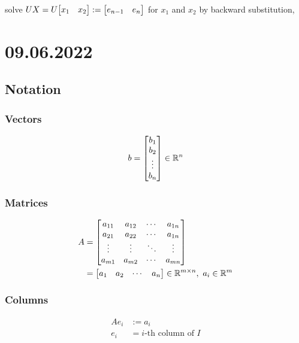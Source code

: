 \documentclass[11pt]{article}
\newcommand{\triu}{\mathop{\mathrm{triu}}}
\newcommand{\T}{\mathrm{T}}
\begin{document}
\noindent solve $UX = U\mqty[x_{1} & x_{2}] := \mqty[e_{n-1} & e_{n}]$ for $x_{1}$ and $x_{2}$ by backward substitution,

\newpage
\section{09.06.2022}

\subsection{Notation}

\subsubsection*{Vectors}

\begin{align*}
    b = \mqty[
        b_{1} \\
        b_{2} \\
        \vdots \\
        b_{n}
        ]
    \in \mathbb{R}^n
\end{align*}


\subsubsection*{Matrices}

\begin{align*}
    A &= \mqty[
        a_{11} & a_{12} & \cdots & a_{1n} \\
        a_{21} & a_{22} & \cdots & a_{1n} \\
        \vdots & \vdots & \ddots & \vdots \\
        a_{m1} & a_{m2} & \cdots & a_{mn}
        ]\\
    &= \mqty[
        a_{1} & a_{2} & \cdots & a_{n}
        ]
    \in \mathbb{R}^{m \times n}
    ,\ a_{i} \in \mathbb{R}^{m}
\end{align*}

\subsubsection*{Columns}

\begin{align*}
    Ae_{i} &:= a_{i}\\
    e_{i} &= i\text{-th column of }I\\
\end{align*}
\end{document}
